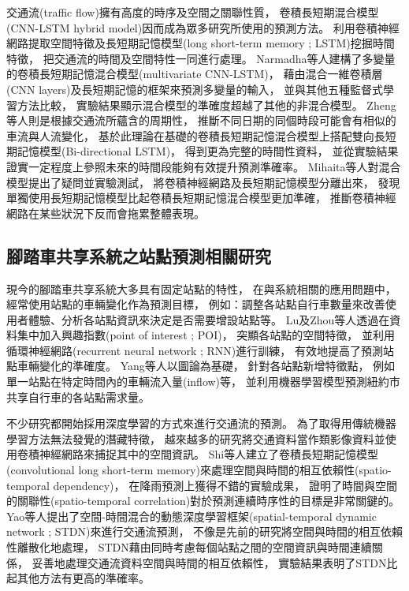 \documentclass[a4paper,14pt]{extarticle}
\begin{document}
            交通流(traffic flow)擁有高度的時序及空間之關聯性質，
            卷積長短期混合模型(CNN-LSTM hybrid model)因而成為眾多研究所使用的預測方法。
            利用卷積神經網路提取空間特徵及長短期記憶模型(long short-term memory ; LSTM)挖掘時間特徵，
            把交通流的時間及空間特性一同進行處理。
            Narmadha等人\cite{NARMADHA2021}建構了多變量的卷積長短期記憶混合模型(multivariate CNN-LSTM)，
            藉由混合一維卷積層(CNN layers)及長短期記憶的框架來預測多變量的輸入，
            並與其他五種監督式學習方法比較，
            實驗結果顯示混合模型的準確度超越了其他的非混合模型。
            Zheng等人\cite{8171119}則是根據交通流所蘊含的周期性，
            推斷不同日期的同個時段可能會有相似的車流與人流變化，
            基於此理論在基礎的卷積長短期記憶混合模型上搭配雙向長短期記憶模型(Bi-directional LSTM)，
            得到更為完整的時間性資料，
            並從實驗結果證實一定程度上參照未來的時間段能夠有效提升預測準確率。
            Mihaita等人\cite{8916852}對混合模型提出了疑問並實驗測試，
            將卷積神經網路及長短期記憶模型分離出來，
            發現單獨使用長短期記憶模型比起卷積長短期記憶混合模型更加準確，
            推斷卷積神經網路在某些狀況下反而會拖累整體表現。
    
        \subsection{腳踏車共享系統之站點預測相關研究}
            
            現今的腳踏車共享系統大多具有固定站點的特性，
            在與系統相關的應用問題中，
            經常使用站點的車輛變化作為預測目標，
            例如：調整各站點自行車數量來改善使用者體驗、分析各站點資訊來決定是否需要增設站點\cite{PARK2017154}等。
            Lu\cite{9093851}及Zhou\cite{8621918}等人透過在資料集中加入興趣指數(point of interest ; POI)，
            突顯各站點的空間特徵，
            並利用循環神經網路(recurrent neural network ; RNN)進行訓練，
            有效地提高了預測站點車輛變化的準確度。
            Yang等人\cite{YANG2020101521}以圖論為基礎，
            針對各站點新增特徵點，
            例如單一站點在特定時間內的車輛流入量(inflow)等，
            並利用機器學習模型預測紐約市共享自行車的各站點需求量。
         
            不少研究都開始採用深度學習的方式\cite{Lv2015TrafficFP}來進行交通流的預測。
            為了取得用傳統機器學習方法無法發覺的潛藏特徵，
            越來越多的研究將交通資料當作類影像資料並使用卷積神經網路來捕捉其中的空間資訊。
            Shi\cite{shi2015convolutional}等人建立了卷積長短期記憶模型(convolutional long short-term memory)來處理空間與時間的相互依賴性(spatio-temporal dependency)，
            在降雨預測上獲得不錯的實驗成果，
            證明了時間與空間的關聯性(spatio-temporal correlation)對於預測連續時序性的目標是非常關鍵的。
            Yao等人\cite{yao2019revisiting}提出了空間-時間混合的動態深度學習框架(spatial-temporal dynamic network ; STDN)來進行交通流預測，
            不像是先前的研究將空間與時間的相互依賴性離散化地處理，
            STDN藉由同時考慮每個站點之間的空間資訊與時間連續關係，
            妥善地處理交通流資料空間與時間的相互依賴性，
            實驗結果表明了STDN比起其他方法有更高的準確率。
\end{document}
